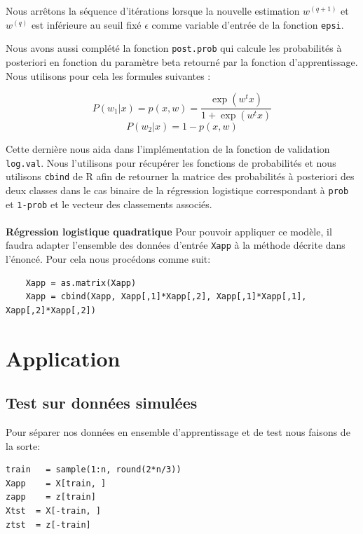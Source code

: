 \documentclass[10pt]{article}
\begin{document}
	Nous arrêtons la séquence d'itérations lorsque la nouvelle estimation $w^{(q+1)}$ et $w^{(q)}$ est inférieure au seuil fixé $\epsilon$ comme variable d'entrée de la fonction \texttt{epsi}. 
	
	Nous avons aussi complété la fonction \texttt{post.prob} qui calcule les probabilités à posteriori en fonction du paramètre beta retourné par la fonction d'apprentissage. Nous utilisons pour cela les formules suivantes : 
	
	\begin{equation*}
	P(w_{1}|x) = p(x,w) = \dfrac{\exp(w^{t}x)}{1+\exp(w^{t}x)}
	\end{equation*}
	\begin{equation*}
	P(w_{2}|x) = 1-p(x,w)
	\end{equation*}
	
	Cette dernière nous aida dans l'implémentation de la fonction de validation \texttt{log.val}. Nous l'utilisons pour récupérer les fonctions de probabilités et nous utilisons \texttt{cbind} de R afin de retourner la matrice des probabilités à posteriori des deux classes dans le cas binaire de la régression logistique correspondant à \texttt{prob} et \texttt{1-prob} et le vecteur des classements associés.
	\\
	\\
	\textbf{Régression logistique quadratique}
	 Pour pouvoir appliquer ce modèle, il faudra adapter l'ensemble des données d'entrée \texttt{Xapp} à la méthode décrite dans l'énoncé. Pour cela nous procédons comme suit: 
	\begin{lstlisting}
	Xapp = as.matrix(Xapp)
	Xapp = cbind(Xapp, Xapp[,1]*Xapp[,2], Xapp[,1]*Xapp[,1], Xapp[,2]*Xapp[,2])
	\end{lstlisting}
	
\section{Application}
\subsection{Test sur données simulées}
Pour séparer nos données en ensemble d'apprentissage et de test nous faisons de la sorte:
\begin{lstlisting}
train   = sample(1:n, round(2*n/3)) 
Xapp    = X[train, ]
zapp    = z[train]
Xtst  = X[-train, ]
ztst  = z[-train]
\end{lstlisting}
\end{document}
